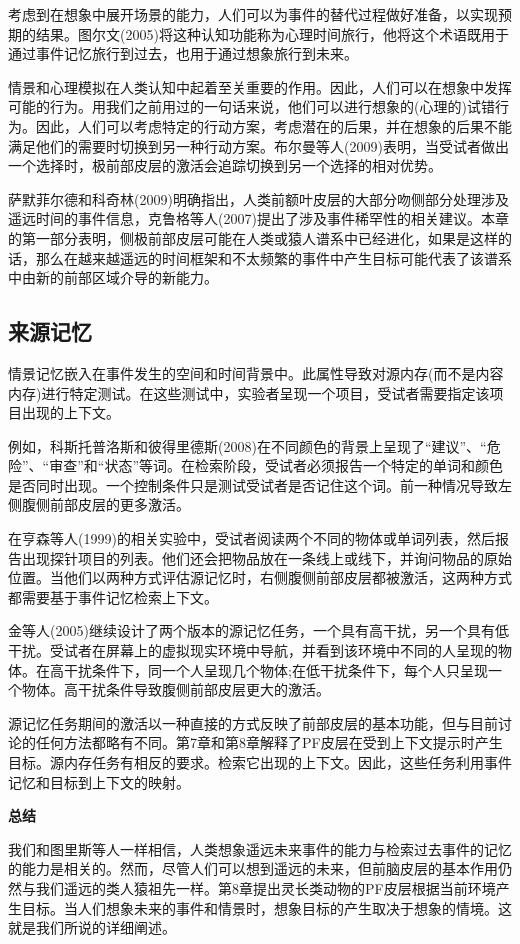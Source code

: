 考虑到在想象中展开场景的能力，人们可以为事件的替代过程做好准备，以实现预期的结果。图尔文(2005)将这种认知功能称为心理时间旅行，他将这个术语既用于通过事件记忆旅行到过去，也用于通过想象旅行到未来。

情景和心理模拟在人类认知中起着至关重要的作用。因此，人们可以在想象中发挥可能的行为。用我们之前用过的一句话来说，他们可以进行想象的(心理的)试错行为。因此，人们可以考虑特定的行动方案，考虑潜在的后果，并在想象的后果不能满足他们的需要时切换到另一种行动方案。布尔曼等人(2009)表明，当受试者做出一个选择时，极前部皮层的激活会追踪切换到另一个选择的相对优势。

萨默菲尔德和科奇林(2009)明确指出，人类前额叶皮层的大部分吻侧部分处理涉及遥远时间的事件信息，克鲁格等人(2007)提出了涉及事件稀罕性的相关建议。本章的第一部分表明，侧极前部皮层可能在人类或猿人谱系中已经进化，如果是这样的话，那么在越来越遥远的时间框架和不太频繁的事件中产生目标可能代表了该谱系中由新的前部区域介导的新能力。

\subsection{来源记忆}
情景记忆嵌入在事件发生的空间和时间背景中。此属性导致对源内存(而不是内容内存)进行特定测试。在这些测试中，实验者呈现一个项目，受试者需要指定该项目出现的上下文。

例如，科斯托普洛斯和彼得里德斯(2008)在不同颜色的背景上呈现了“建议”、“危险”、“审查”和“状态”等词。在检索阶段，受试者必须报告一个特定的单词和颜色是否同时出现。一个控制条件只是测试受试者是否记住这个词。前一种情况导致左侧腹侧前部皮层的更多激活。

在亨森等人(1999)的相关实验中，受试者阅读两个不同的物体或单词列表，然后报告出现探针项目的列表。他们还会把物品放在一条线上或线下，并询问物品的原始位置。当他们以两种方式评估源记忆时，右侧腹侧前部皮层都被激活，这两种方式都需要基于事件记忆检索上下文。

金等人(2005)继续设计了两个版本的源记忆任务，一个具有高干扰，另一个具有低干扰。受试者在屏幕上的虚拟现实环境中导航，并看到该环境中不同的人呈现的物体。在高干扰条件下，同一个人呈现几个物体;在低干扰条件下，每个人只呈现一个物体。高干扰条件导致腹侧前部皮层更大的激活。

源记忆任务期间的激活以一种直接的方式反映了前部皮层的基本功能，但与目前讨论的任何方法都略有不同。第7章和第8章解释了PF皮层在受到上下文提示时产生目标。源内存任务有相反的要求。检索它出现的上下文。因此，这些任务利用事件记忆和目标到上下文的映射。

\textbf{总结}

我们和图里斯等人一样相信，人类想象遥远未来事件的能力与检索过去事件的记忆的能力是相关的。然而，尽管人们可以想到遥远的未来，但前脑皮层的基本作用仍然与我们遥远的类人猿祖先一样。第8章提出灵长类动物的PF皮层根据当前环境产生目标。当人们想象未来的事件和情景时，想象目标的产生取决于想象的情境。这就是我们所说的详细阐述。

